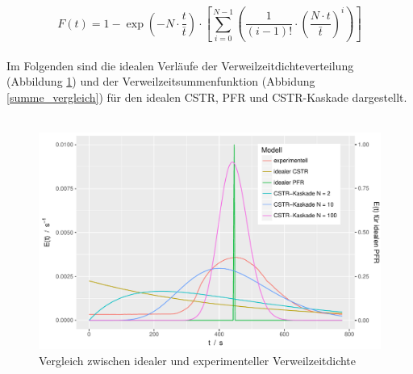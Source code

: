 \documentclass[12pt,liststotoc]{report}
\begin{document}
\begin{equation}
F(t) = 1 - \exp\left(- N \cdot \frac{t}{\bar{t}}\right) \cdot \left[ \sum_{i=0}^{N-1} \left(\frac{1}{(i-1)!} \cdot \left(\frac{N \cdot t}{\bar{t}} \right)^i \right) \right]
\end{equation}
\noindent
\\
Im Folgenden sind die idealen Verläufe der Verweilzeitdichteverteilung (Abbildung \ref{dichte_vergleich}) und der Verweilzeitsummenfunktion (Abbidung \ref{summe_vergleich}) für den idealen CSTR, PFR und CSTR-Kaskade dargestellt.
\\
\\
\begin{figure}[H]
\centering
\includegraphics[width=1\textwidth]{Graphics/E_vergleich.pdf}
\caption[Vergleich Verweilzeitdichten]{Vergleich zwischen idealer und experimenteller Verweilzeitdichte}
\label{dichte_vergleich}
\end{figure}
\noindent
\end{document}
